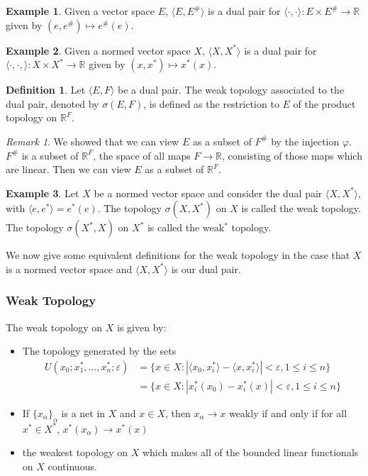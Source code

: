 \documentclass[11pt, reqno]{article}
\theoremstyle{plain}
\theoremstyle{definition}
\newtheorem*{definition}{Definition}
\newtheorem*{example}{Example}
\theoremstyle{remark}
\newtheorem*{remark}{Remark}
\renewcommand{\epsilon}{\varepsilon}
\newcommand{\RR}{\mathbb{R}}
\begin{document}
\begin{example}
    Given a vector space $E$, $\langle E, E^\# \rangle$ is a dual pair for $\langle \cdot, \cdot \rangle: 
    E\times E^\# \rightarrow \RR$ given by $(e, e^\#) \mapsto e^\#(e)$.
\end{example}

\begin{example}
    Given a normed vector space $X$, $\langle X, X^*\rangle$ is a dual pair for $\langle \cdot, \cdot, \rangle: 
    X\times X^* \rightarrow \RR$ given by $(x,x^*) \mapsto x^*(x)$.
\end{example}

\begin{definition}
    Let $\langle E,F\rangle$ be a dual pair. The weak topology associated to the dual pair, denoted by $\sigma(E,F)$, is 
    defined as the restriction to $E$ of the product topology on $\RR^F$. 
\end{definition}

\begin{remark}
    We showed that we can view $E$ as a subset of $F^\#$ by the injection $\varphi$. $F^\#$ is a subset of $\RR^F$, the space
    of all maps $F \rightarrow \RR$, consisting of those maps which are linear. Then we can view $E$ as a subset of $\RR^F$. 
\end{remark}

\begin{example}
    Let $X$ be a normed vector space and consider the dual pair $\langle X, X^*\rangle$, with $\langle e, e^*\rangle = e^*(e)$.
    The topology $\sigma(X,X^*)$ on $X$ is called the weak topology. The topology $\sigma(X^*, X)$ on $X^*$ is called
    the weak$^*$ topology. 
\end{example}

We now give some equivalent definitions for the weak topology in the case that $X$ is a normed vector space
and $\langle X, X^*\rangle$ is our dual pair. 

\subsubsection*{Weak Topology} 

The weak topology on $X$ is given by: 
\begin{itemize}
    \item The topology generated by the sets 
    \begin{align*}
    U(x_0; x_1^*, \dots, x_n^*; \epsilon) &= \{x \in X: |\langle x_0, x_i^*\rangle - \langle x, x_i^*\rangle| < \epsilon, 1 \leq i \leq n\}\\
    & = \{x \in X: |x_i^*(x_0) - x_i^*(x)| < \epsilon, 1 \leq i \leq n\}
    \end{align*}
    
    \item If $\{x_\alpha\}_{\alpha}$ is a net in $X$ and $x \in X$, then $x_\alpha \rightarrow x$ weakly if and only if 
    for all $x^* \in X^*$, $x^*(x_\alpha) \rightarrow x^*(x)$

    \item the weakest topology on $X$ which makes all of the bounded linear functionals on $X$ continuous.
\end{itemize}
\end{document}

